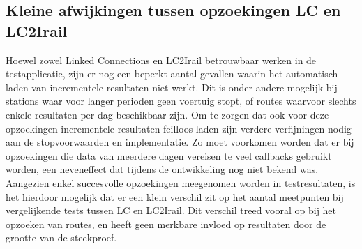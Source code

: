 \subsection{Kleine afwijkingen tussen opzoekingen LC en LC2Irail}
Hoewel zowel Linked Connections en LC2Irail betrouwbaar werken in de testapplicatie, zijn er nog een beperkt aantal gevallen waarin het automatisch laden van incrementele resultaten niet werkt. Dit is onder andere mogelijk bij stations waar voor langer perioden geen voertuig stopt, of routes waarvoor slechts enkele resultaten per dag beschikbaar zijn. Om te zorgen dat ook voor deze opzoekingen incrementele resultaten feilloos laden zijn verdere verfijningen nodig aan de stopvoorwaarden en implementatie. Zo moet voorkomen worden dat er bij opzoekingen die data van meerdere dagen vereisen te veel callbacks gebruikt worden, een neveneffect dat tijdens de ontwikkeling nog niet bekend was. Aangezien enkel succesvolle opzoekingen meegenomen worden in testresultaten, is het hierdoor mogelijk dat er een klein verschil zit op het aantal meetpunten bij vergelijkende tests tussen LC en LC2Irail. Dit verschil treed vooral op bij het opzoeken van routes, en heeft geen merkbare invloed op resultaten door de grootte van de steekproef.